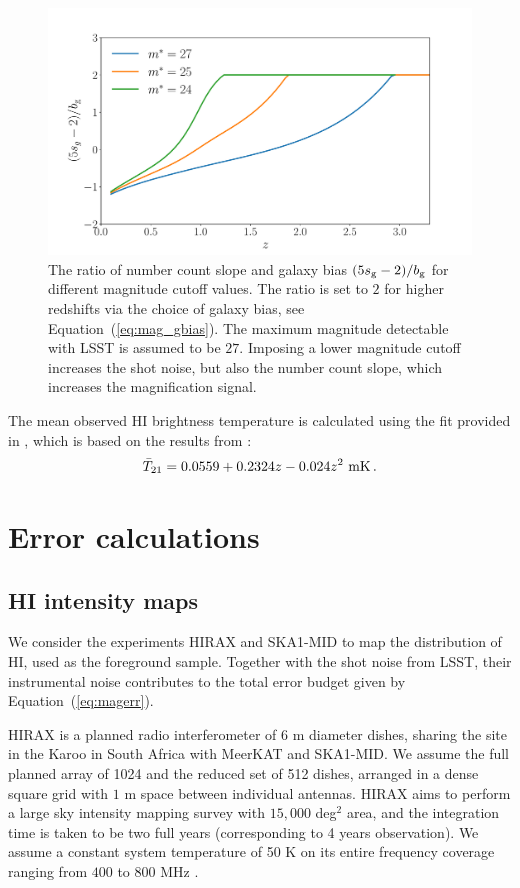 \documentclass[useAMS,usenatbib]{mnras}
\newcommand{\be}{\begin{equation}}
\newcommand{\ee}{\end{equation}}
\begin{document}
\begin{figure}
\centering\includegraphics[width=0.85\columnwidth]{sg5m2bybg.pdf}
\caption{The ratio of number count slope and galaxy bias $(5s_{\rm g}-2)/b_{\rm g}$ for different magnitude cutoff values. The ratio is set to $2$ for higher redshifts via the choice of galaxy bias, see Equation~(\ref{eq:mag_gbias}). The maximum magnitude detectable with LSST is assumed to be $27$. Imposing a lower magnitude cutoff increases the shot noise, but also the number count slope, which increases the magnification signal. }
\label{fig:sg}
\end{figure}

The mean observed HI brightness temperature is calculated using the fit provided in \cite{2017arXiv170906099S}, which is based on the results from \cite{2015aska.confE..19S}:
\be
\bar{T}_{21} = 0.0559+0.2324z-0.024 z^2 {\rm~mK} \, .
\ee





\section{Error calculations}
\label{sec:error}

\subsection{HI intensity maps}

We consider the experiments HIRAX and SKA1-MID to map the distribution of HI, used as the foreground sample. Together with the shot noise from LSST, their instrumental noise contributes to the total error budget given by Equation~(\ref{eq:magerr}).

HIRAX is a planned radio interferometer of $6$ m diameter dishes, sharing the site in the Karoo in South Africa with MeerKAT and SKA1-MID. We assume the full planned array of 1024 and the reduced set of 512 dishes, arranged in a dense square grid with $1$ m space between individual antennas. HIRAX aims to perform a large sky intensity mapping survey with $15,000$ deg${}^2$ area, and the integration time is taken to be two full years (corresponding to 4 years observation). We assume a constant system temperature of 50 K on its entire frequency coverage ranging from $400$ to $800$ MHz \citep{2016SPIE.9906E..5XN}.
\end{document}
